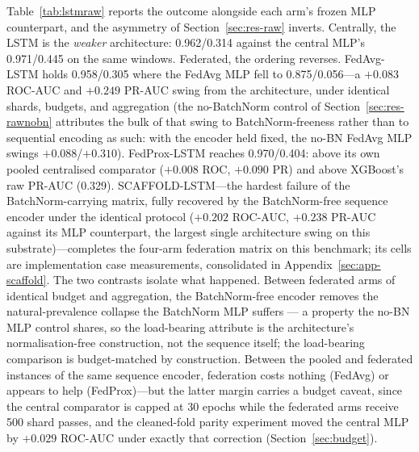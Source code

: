 Table~\ref{tab:lstmraw} reports the outcome alongside each arm's
frozen MLP counterpart, and the asymmetry of
Section~\ref{sec:res-raw} inverts. Centrally, the LSTM is the
\emph{weaker} architecture: 0.962/0.314 against the central MLP's
0.971/0.445 on the same windows. Federated, the ordering reverses.
FedAvg-LSTM holds 0.958/0.305 where the FedAvg MLP fell to
0.875/0.056---a $+0.083$ ROC-AUC and $+0.249$ PR-AUC swing from the
architecture, under identical shards, budgets, and aggregation (the
no-BatchNorm control of Section~\ref{sec:res-rawnobn} attributes the
bulk of that swing to BatchNorm-freeness rather than to sequential
encoding as such: with the encoder held fixed, the no-BN FedAvg MLP
swings $+0.088$/$+0.310$).
FedProx-LSTM reaches 0.970/0.404: above its own pooled centralised
comparator ($+0.008$ ROC, $+0.090$ PR) and above XGBoost's raw
PR-AUC (0.329). SCAFFOLD-LSTM---the hardest failure of the
BatchNorm-carrying matrix, fully recovered by the BatchNorm-free
sequence encoder under the identical protocol ($+0.202$ ROC-AUC,
$+0.238$ PR-AUC against its MLP counterpart, the largest single
architecture swing on this substrate)---completes the four-arm
federation matrix on this benchmark; its cells are implementation
case measurements, consolidated in
Appendix~\ref{sec:app-scaffold}. The two contrasts isolate what happened. Between
federated arms of identical budget and aggregation, the
BatchNorm-free encoder removes the natural-prevalence collapse the
BatchNorm MLP suffers --- a property the no-BN MLP control shares,
so the load-bearing attribute is the architecture's normalisation-free
construction, not the sequence itself; the
load-bearing comparison is budget-matched by construction. Between
the pooled and federated instances of the same sequence encoder,
federation costs nothing (FedAvg) or appears to help (FedProx)---but
the latter margin carries a budget caveat, since the central
comparator is capped at 30 epochs while the federated arms receive
500 shard passes, and the cleaned-fold parity experiment moved the
central MLP by $+0.029$ ROC-AUC under exactly that correction
(Section~\ref{sec:budget}).


